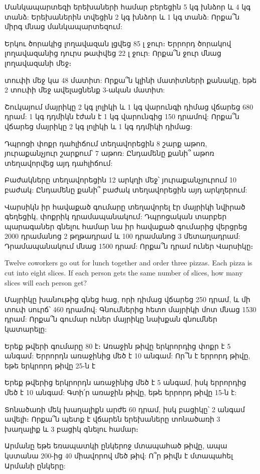 \problem
Մանկապարտեզի երեխաների համար բերե\-ցին 5 կգ խնձոր և 4 
կգ տանձ: Երեխաներին տվեցին 2 կգ խնձոր և 1 կգ տանձ: 
Որքա՞ն միրգ մնաց մանկապարտեզում:

\problem 
Երկու ծորակից լողավազան լցվեց 85 լ ջուր։ Երրորդ ծորակով 
լողավազանից դուրս թափ\-վեց 22 լ ջուր: Որքա՞ն ջուր մնաց 
լողավա\-զանի մեջ։

 տուփի մեջ կա 48 մատիտ: Որքա՞ն կլինի մա\-տիտների 
քանակը, եթե 2 տուփի մեջ ավելաց\-նենք 3-ական մատիտ:

\problem 
Շուկայում մայրիկը 2 կգ լոլիկի և 1 կգ վարունգի դիմաց վճարեց 
680 դրամ: 1 կգ դդմիկն էժան է 1 կգ վարունգից 150 դրամով: 
Որքա՞ն վճարեց մայրիկը 2 կգ լոլիկի և 1 կգ դդմիկի դիմաց:

\problem
Դպրոցի փոքր դահլիճում տեղավորեցին 8 շարք աթոռ, յուրաքանչյուր 
շարքում՝ 7 աթոռ: Ընդամենը քանի՞ աթոռ տեղավորվեց այդ դահլիճում:

\problem
Բաժակները տեղավորեցին 12 արկղի մեջ՝ յուրաքանչյուրում 10 
բաժակ: Ընդամենը քանի՞ բաժակ տեղավորեցին այդ արկղերում:

\problem
Վարսիկն իր հավաքած գումարը տեղա\-վորել էր մայրիկի նվիրած 
գեղեցիկ, փոքրիկ դրամա\-պանակում: Դպրոցական տարբեր պա\-րագաներ 
գնելու համար նա իր հավաքած գումարից վերցրեց 2000 դրամանոց 
2 թղթա\-դրամ և 100 դրամանոց 3 մետաղադրամ: Դրամապանակում 
մնաց 1500 դրամ: Որքա՞ն դրամ ուներ Վարսիկը։

\problem
Twelve coworkers go out for lunch together and order three 
pizzas. Each pizza is cut into eight slices. If each person 
gets the same number of slices, how many slices will each 
person get?

\problem
Մայրիկը խանութից գնեց հաց, որի դիմաց վճարեց 250 դրամ, 
և մի տուփ սուրճ՝ 460 դրամով: Գնումներից հետո մայրիկի 
մոտ մնաց 1530 դրամ: Որքա՞ն գումար ուներ մայրիկը նախքան 
գնումներ կատարելը:

\problem
Երեք թվերի գումարը 80 է։ Առաջին թիվը երկրորդից փոքր 
է 5 անգամ: Երրորդն առա\-ջինից մեծ է 10 անգամ: Որ՞ն է 
երրորդ թիվը, եթե երկրորդ թիվը 25-ն է

\problem
Երեք թվերից երկրորդն առաջինից մեծ է 5 անգամ, իսկ 
երրորդից մեծ է 10 անգամ: Գտի՛ր առաջին թիվը, եթե 
երրորդ թիվը 15-ն է:

\problem
Տոնածառի մեկ խաղալիքն արժե 60 դրամ, իսկ բացիկը՝ 2 
անգամ ավելի։ Որքա՞ն պետք է վճարեն երեխաները տոնածառի 
3 խաղալիք և 3 բացիկ գնելու համար։

\problem
Արմանը եթե եռապատկի ընկերոջ մտապահած թիվը, ապա կստանա 
200-ից 40 միավորով մեծ թիվ: Ո՞ր թիվն է մտապահել Արմանի 
ընկերը:

